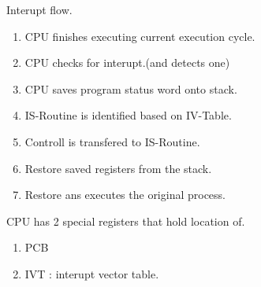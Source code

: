 \begin{enumerate}
  \begin{minipage}{\linewidth}
  \item Interupt flow.
  \begin{enumerate}
        \item CPU finishes executing current execution cycle.
        \item CPU checks for interupt.(and detects one)
        \item CPU saves program status word onto stack.
        \item IS-Routine is identified based on IV-Table.
        \item Controll is transfered to IS-Routine.
        \item Restore saved registers from the stack.
        \item Restore ans executes the original process.
  \end{enumerate}
  \end{minipage} \vspace{0.08in}

  \item CPU has 2 special registers that hold location of.
  \begin{enumerate}
        \item PCB
        \item IVT : interupt vector table.
  \end{enumerate}



\end{enumerate}








